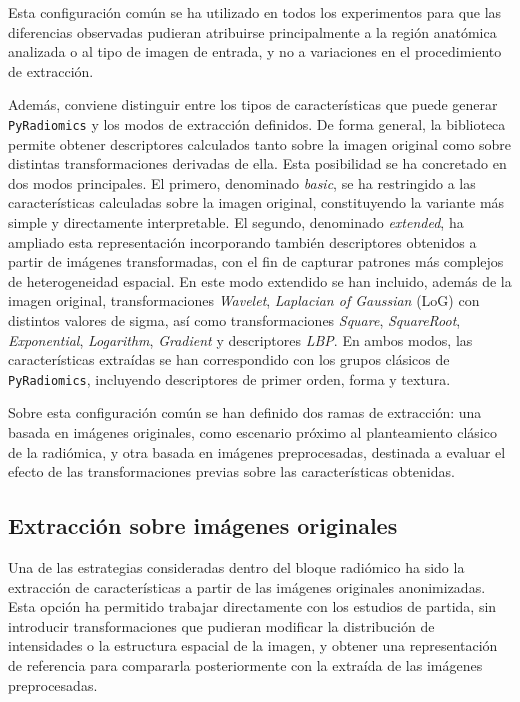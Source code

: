 Esta configuración común se ha utilizado en todos los experimentos para que las diferencias observadas pudieran atribuirse principalmente a la región anatómica analizada o al tipo de imagen de entrada, y no a variaciones en el procedimiento de extracción.

Además, conviene distinguir entre los tipos de características que puede generar \texttt{PyRadiomics} y los modos de extracción definidos. De forma general, la biblioteca permite obtener descriptores calculados tanto sobre la imagen original como sobre distintas transformaciones derivadas de ella. Esta posibilidad se ha concretado en dos modos principales. El primero, denominado \textit{basic}, se ha restringido a las características calculadas sobre la imagen original, constituyendo la variante más simple y directamente interpretable. El segundo, denominado \textit{extended}, ha ampliado esta representación incorporando también descriptores obtenidos a partir de imágenes transformadas, con el fin de capturar patrones más complejos de heterogeneidad espacial. En este modo extendido se han incluido, además de la imagen original, transformaciones \textit{Wavelet}, \textit{Laplacian of Gaussian} (LoG) con distintos valores de sigma, así como transformaciones \textit{Square}, \textit{SquareRoot}, \textit{Exponential}, \textit{Logarithm}, \textit{Gradient} y descriptores \textit{LBP}. En ambos modos, las características extraídas se han correspondido con los grupos clásicos de \texttt{PyRadiomics}, incluyendo descriptores de primer orden, forma y textura.

Sobre esta configuración común se han definido dos ramas de extracción: una basada en imágenes originales, como escenario próximo al planteamiento clásico de la radiómica, y otra basada en imágenes preprocesadas, destinada a evaluar el efecto de las transformaciones previas sobre las características obtenidas.

\subsection{Extracción sobre imágenes originales}

Una de las estrategias consideradas dentro del bloque radiómico ha sido la extracción de características a partir de las imágenes originales anonimizadas. Esta opción ha permitido trabajar directamente con los estudios de partida, sin introducir transformaciones que pudieran modificar la distribución de intensidades o la estructura espacial de la imagen, y obtener una representación de referencia para compararla posteriormente con la extraída de las imágenes preprocesadas.

